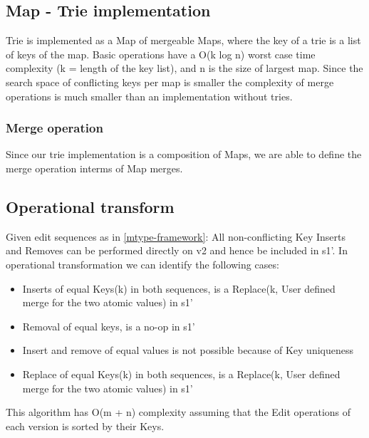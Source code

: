 \documentclass{article}
\begin{document}
\subsection{Map - Trie implementation}
Trie is implemented as a Map of mergeable Maps, where the key of a trie is a list of keys of the map. 
Basic operations have a O(k log n) worst case time complexity (k = length of the key list), 
and n is the size of largest map. Since the search space of conflicting keys per map is smaller the complexity of 
merge operations is much smaller than an implementation without tries.

\subsubsection{Merge operation}
Since our trie implementation is a composition of Maps, we are able to define the merge operation interms of Map merges.

\subsection{Operational transform}
Given edit sequences as in \ref{mtype-framework}: 
All non-conflicting Key Inserts and Removes can be performed directly on v2 and hence be included in s1'. 
In operational transformation we can identify the following cases:
\begin{itemize}
\item Inserts of equal Keys(k) in both sequences, is a Replace(k, User defined merge for the two atomic values) in s1'
\item Removal of equal keys, is a no-op in s1'
\item Insert and remove of equal values is not possible because of Key uniqueness
\item Replace of equal Keys(k) in both sequences, is a Replace(k, User defined merge for the two atomic values) in s1'
\end{itemize}
This algorithm has O(m + n) complexity assuming that the Edit operations of each version is sorted by their Keys.
\end{document}

